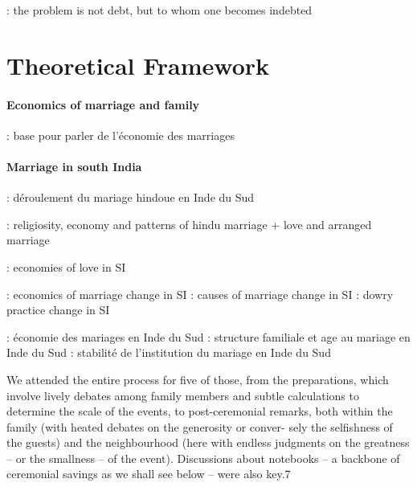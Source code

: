 \documentclass[a4paper, 11pt, onecolumn]{article}
\begin{document}
\cite{Guerin2014a} : the problem is not debt, but to whom one becomes indebted




\section{Theoretical Framework}

\paragraph{Economics of marriage and family}
\cite{Becker1973} : base pour parler de l'économie des marriages



\paragraph{Marriage in south India}
\cite{Shulman1980, Meinzen1980} : déroulement du mariage hindoue en Inde du Sud 

\cite{Gupta1972, Gupta1976} : religiosity, economy and patterns of hindu marriage + love and arranged marriage

\cite{DeNeve2016} : economies of love in SI

\cite{Dharmalingam1994} : economics of marriage change in SI
\cite{Caldwell1983} : causes of marriage change in SI
\cite{Srinivasan2005} : dowry practice change in SI

\cite{Jejeebhoy2005} : économie des mariages en Inde du Sud
\cite{Reddy1991} : structure familiale et age au mariage en Inde du Sud
\cite{James2015} : stabilité de l'institution du mariage en Inde du Sud

\cite{Rao2001, Rao2001a}

\cite{Guerin2020c}
We attended the entire process for five of those, from the preparations, which involve
lively debates among family members and subtle calculations to determine the scale of the events, to
post-ceremonial remarks, both within the family (with heated debates on the generosity or conver-
sely the selfishness of the guests) and the neighbourhood (here with endless judgments on the greatness – or the smallness – of the event). Discussions about notebooks – a backbone of ceremonial
savings as we shall see below – were also key.7
\end{document}
